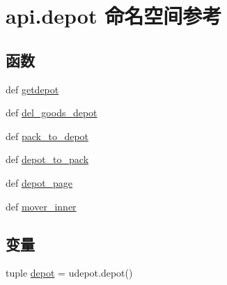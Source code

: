 \hypertarget{namespaceapi_1_1depot}{\section{api.\-depot 命名空间参考}
\label{namespaceapi_1_1depot}
}
\subsection*{函数}
\begin{DoxyCompactItemize}
\item 
def \hyperlink{namespaceapi_1_1depot_ac815e420cc6422e0d797d4288edd4da9}{getdepot}
\item 
def \hyperlink{namespaceapi_1_1depot_a8c40dc05c5af7f66d99cc2110a699428}{del\-\_\-goods\-\_\-depot}
\item 
def \hyperlink{namespaceapi_1_1depot_aa2b84ef3c7e7eba9d538c6ce9c98f57c}{pack\-\_\-to\-\_\-depot}
\item 
def \hyperlink{namespaceapi_1_1depot_a2837362e9e92c6385eee83744df54185}{depot\-\_\-to\-\_\-pack}
\item 
def \hyperlink{namespaceapi_1_1depot_a84bf01e77fbf4f9f37157a48174c6687}{depot\-\_\-page}
\item 
def \hyperlink{namespaceapi_1_1depot_ace9a56166bbc547a2f820cf000b4fb30}{mover\-\_\-inner}
\end{DoxyCompactItemize}
\subsection*{变量}
\begin{DoxyCompactItemize}
\item 
tuple \hyperlink{namespaceapi_1_1depot_a5f505b41d9440b584d32e3aa18d3dbd5}{depot} = udepot.\-depot()
\end{DoxyCompactItemize}


